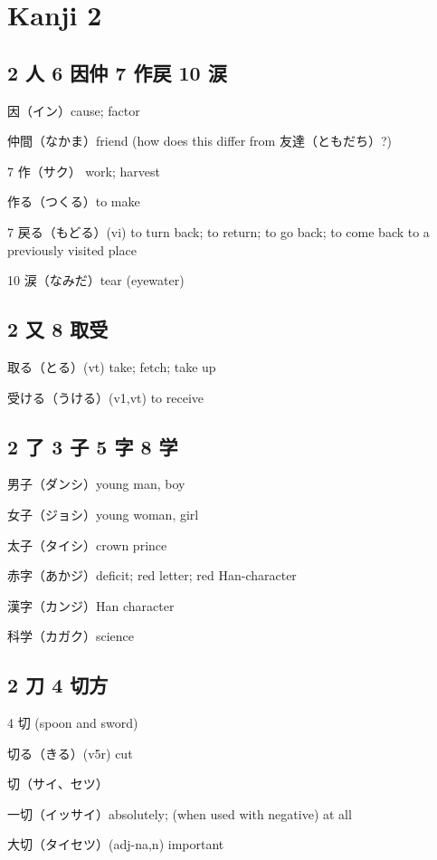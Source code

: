 \chapter{Kanji 2}

\section{2 人 6 因仲 7 作戻 10 涙}

因（イン）cause; factor

仲間（なかま）friend (how does this differ from 友達（ともだち）?)

7 作（サク） work; harvest

作る（つくる）to make

7 戻る（もどる）(vi) to turn back; to return; to go back;
to come back to a previously visited place

10 涙（なみだ）tear (eyewater)

\section{2 又 8 取受}

取る（とる）(vt) take; fetch; take up

受ける（うける）(v1,vt) to receive

\section{2 了 3 子 5 字 8 学}

男子（ダンシ）young man, boy

女子（ジョシ）young woman, girl

太子（タイシ）crown prince

赤字（あかジ）deficit; red letter; red Han-character

漢字（カンジ）Han character

科学（カガク）science

\section{2 刀 4 切方}

4 切 (spoon and sword)

切る（きる）(v5r) cut

切（サイ、セツ）

一切（イッサイ）absolutely; (when used with negative) at all

大切（タイセツ）(adj-na,n) important

